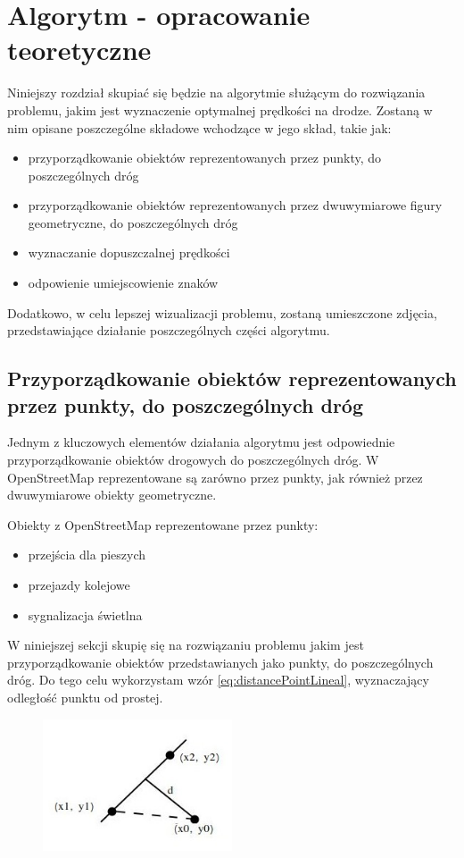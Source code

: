 \chapter{Algorytm - opracowanie teoretyczne}
\label{cha:AlgorytmTeoria}

Niniejszy rozdział skupiać się będzie na algorytmie służącym do rozwiązania problemu, jakim jest wyznaczenie optymalnej prędkości na drodze. Zostaną w nim opisane poszczególne składowe wchodzące w jego skład, takie jak:
\begin{itemize}
\item przyporządkowanie obiektów reprezentowanych przez punkty, do poszczególnych dróg
\item przyporządkowanie obiektów reprezentowanych przez dwuwymiarowe figury geometryczne, do poszczególnych dróg
\item wyznaczanie dopuszczalnej prędkości
\item odpowienie umiejscowienie znaków
\end{itemize}

Dodatkowo, w celu lepszej wizualizacji problemu, zostaną umieszczone zdjęcia, przedstawiające działanie poszczególnych części algorytmu.

\newpage
\section{Przyporządkowanie obiektów reprezentowanych przez punkty, do poszczególnych dróg}
\label{sec:ObiektyPunktDrogi}

Jednym z kluczowych elementów działania algorytmu jest odpowiednie przyporządkowanie obiektów drogowych do poszczególnych dróg. W OpenStreetMap reprezentowane są zarówno przez punkty, jak również przez dwuwymiarowe obiekty geometryczne.


Obiekty z OpenStreetMap reprezentowane przez punkty:
\begin{itemize}
\item przejścia dla pieszych
\item przejazdy kolejowe
\item sygnalizacja świetlna
\end{itemize}


W niniejszej sekcji skupię się na rozwiązaniu problemu jakim jest przyporządkowanie obiektów przedstawianych jako punkty, do poszczególnych dróg. Do tego celu wykorzystam wzór \ref{eq:distancePointLineal}, wyznaczający odległość punktu od prostej.

\begin{figure}[h]
\centering
\includegraphics[width=0.5\textwidth]{dlugoscPktOdProstej}
\end{figure}

